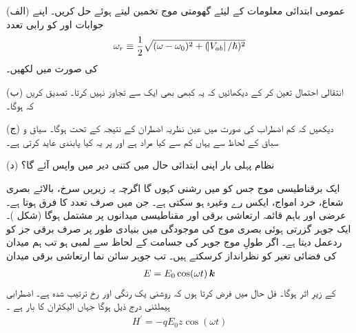 (الف) عمومی ابتدائی معلومات  کے لیئے گھومتی موج تخمین  لیتے ہوئے  حل کریں۔ اپنے جوابات  اور  کو رابی تعدد 
\begin{align}
	\omega_r\equiv\frac{1}{2}\sqrt{(\omega-\omega_0)^2+(\abs{V_{ab}}/\hslash)^2}
\end{align}
کی صورت میں لکھیں۔

(ب) انتقالی احتمال  تعین کر کے دیکھائیں کہ یہ کبھی بھی ایک سے تجاوز نہیں کرتا۔ تصدیق کریں کہ  ہوگا۔

(ج) دیکھیں کہ کم اضطراب کی صورت میں  عین نظریہ اضطران کے نتیجہ  کے تحت ہوگا۔ سیاق و سباق کے لحاظ سے یہاں کم سے کیا مراد ہے اور  پر یہ کیا پابندی عاید کرتی ہے۔

(د) نظام پہلی بار اپنی ابتدائی حال میں کتنی دیر میں واپس آئے گا؟


ایک برقناطیسی موج جس کو میں رشنی کہوں گا اگرچہ یہ زیریں سرخ، بالائے بصری شعاع، خرد امواج، ایکس رے وغیرہ ہو سکتی ہے۔ جن میں صرف تعدد کا فرق ہوتا ہے۔ عرضی اور باہم قائمہ ارتعاشی برقی اور مقناطیسی میدانوں پر مشتمل ہوگا (شکل )۔ ایک جوہر گزرتی ہوئی بصری موج کی موجودگی میں بنیادی طور پر صرف برقی جز کو ردعمل دیتا ہے۔ اگر طولِ موج جوہر کی جسامت کے لحاظ سے لمبی ہو تب ہم میدان کی فضائی تغیر کو نظرانداز کرسکتے ہیں۔ تب جوہر سائن نما ارتعاشی برقی میدان
\begin{align}
	E = E_0\cos(\omega t)\,{\boldsymbol{k}}
\end{align}
کے زیرِ اثر ہوگا۔ فل حال میں فرض کرتا ہوں کہ روشنی یک رنگی اور  رخ ترتیب شدہ ہے۔ اضطرابی ہیملٹنی درج ذیل ہوگا جہاں  الیکٹران کا بار ہے ۔
\begin{align}
	H^\prime =-qE_0z\cos(\omega t)
\end{align}	

